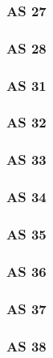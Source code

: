 \subsubsection{AS 27}

\subsubsection{AS 28}

\subsubsection{AS 31}

\subsubsection{AS 32}

\subsubsection{AS 33}

\subsubsection{AS 34}

\subsubsection{AS 35}

\subsubsection{AS 36}

\subsubsection{AS 37}

\subsubsection{AS 38}

